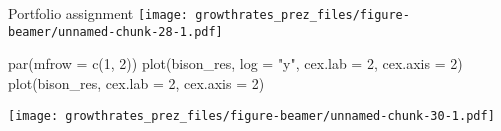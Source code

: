 \documentclass[
  ignorenonframetext,
]{beamer}
\newenvironment{Shaded}{\begin{snugshade}}{\end{snugshade}}
\newcommand{\AttributeTok}[1]{\textcolor[rgb]{0.77,0.63,0.00}{#1}}
\newcommand{\DecValTok}[1]{\textcolor[rgb]{0.00,0.00,0.81}{#1}}
\newcommand{\FloatTok}[1]{\textcolor[rgb]{0.00,0.00,0.81}{#1}}
\newcommand{\FunctionTok}[1]{\textcolor[rgb]{0.00,0.00,0.00}{#1}}
\newcommand{\NormalTok}[1]{#1}
\newcommand{\OtherTok}[1]{\textcolor[rgb]{0.56,0.35,0.01}{#1}}
\newcommand{\SpecialCharTok}[1]{\textcolor[rgb]{0.00,0.00,0.00}{#1}}
\newcommand{\StringTok}[1]{\textcolor[rgb]{0.31,0.60,0.02}{#1}}
\begin{document}
\begin{frame}[fragile]{Portfolio assignment}
\texttt{[image: growthrates\_prez\_files/figure-beamer/unnamed-chunk-28-1.pdf]}

\begin{Shaded}
\end{Shaded}

\begin{Shaded}
\begin{Highlighting}[]
\FunctionTok{par}\NormalTok{(}\AttributeTok{mfrow =} \FunctionTok{c}\NormalTok{(}\DecValTok{1}\NormalTok{, }\DecValTok{2}\NormalTok{))}
\FunctionTok{plot}\NormalTok{(bison\_res, }\AttributeTok{log =} \StringTok{"y"}\NormalTok{, }\AttributeTok{cex.lab =} \DecValTok{2}\NormalTok{, }\AttributeTok{cex.axis =} \DecValTok{2}\NormalTok{)}
\FunctionTok{plot}\NormalTok{(bison\_res, }\AttributeTok{cex.lab =} \DecValTok{2}\NormalTok{, }\AttributeTok{cex.axis =} \DecValTok{2}\NormalTok{)}
\end{Highlighting}
\end{Shaded}

\texttt{[image: growthrates\_prez\_files/figure-beamer/unnamed-chunk-30-1.pdf]}

\begin{Shaded}
\end{Shaded}
\end{frame}
\end{document}
